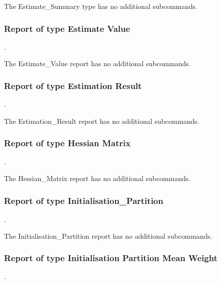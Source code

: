 
The Estimate\_Summary type has no additional subcommands.

\subsubsection{Report of type Estimate Value}
.
\label{syntax:Report-EstimateValue}


The Estimate\_Value report has no additional subcommands.

\subsubsection{Report of type Estimation Result}
.
\label{syntax:Report-EstimationResult}


The Estimation\_Result report has no additional subcommands.

\subsubsection{Report of type Hessian Matrix}
.
\label{syntax:Report-HessianMatrix}

The Hessian\_Matrix report has no additional subcommands.

\subsubsection{Report of type Initialisation\_Partition}
.
\label{syntax:Report-InitialisationPartition}

The Initialisation\_Partition report has no additional subcommands.

\subsubsection{Report of type Initialisation Partition Mean Weight}
.
\label{syntax:Report-InitialisationPartitionMeanWeight}

